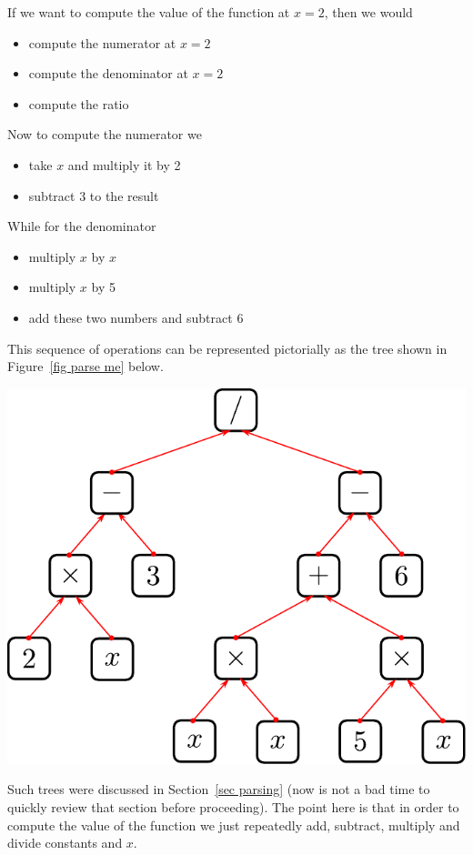 If we want to compute the value of the function at
$x=2$, then we would
\begin{itemize}
 \item compute the numerator at $x=2$
 \item compute the denominator at $x=2$
 \item compute the ratio
\end{itemize}
Now to compute the numerator we
\begin{itemize}
 \item take $x$ and multiply it by 2
 \item subtract 3 to the result
\end{itemize}
While for the denominator
\begin{itemize}
 \item multiply $x$ by $x$
 \item multiply $x$ by 5
 \item add these two numbers and subtract $6$
\end{itemize}
This sequence of operations can be represented pictorially
as the tree shown in Figure~\ref{fig parse me} below.
\begin{fig}
\label{fig parse me}
 \begin{center}
  \includegraphics{tree3}
 \end{center}
\end{fig}
Such trees were discussed in Section~\ref{sec parsing} (now is not a bad time to quickly
review that section before proceeding). The point here is that in order to compute the
value of the function we just repeatedly add, subtract, multiply and divide constants and
$x$.


